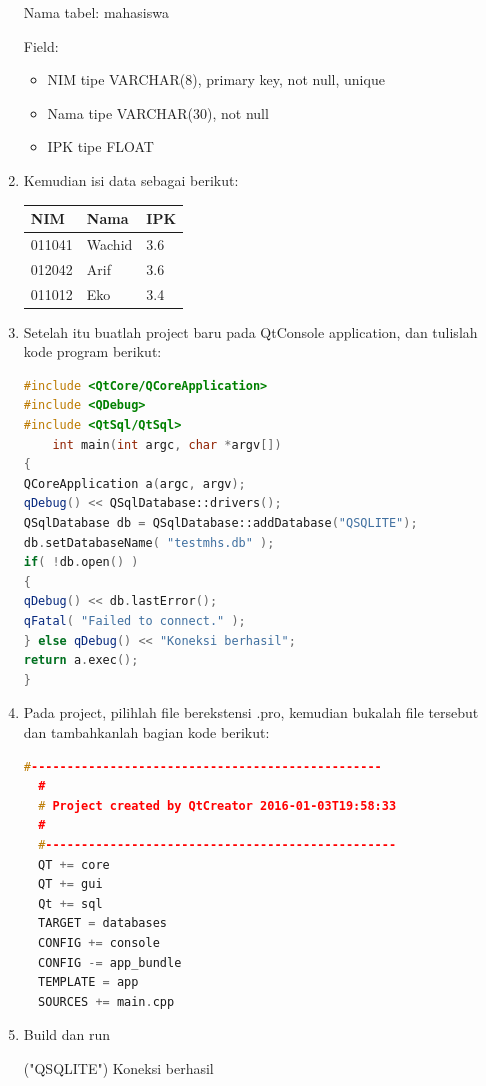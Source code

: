 \begin{enumerate}
Nama tabel: mahasiswa

Field:

\begin{itemize}

\item
  NIM tipe VARCHAR(8), primary key, not null, unique
\item
  Nama tipe VARCHAR(30), not null
\item
  IPK tipe FLOAT
\end{itemize}


\item
  Kemudian isi data sebagai berikut:


\begin{longtable}[]{@{}lll@{}}
\toprule
NIM & Nama & IPK\tabularnewline
\midrule
\endhead
011041 & Wachid & 3.6\tabularnewline
012042 & Arif & 3.6\tabularnewline
011012 & Eko & 3.4\tabularnewline
\bottomrule
\end{longtable}


\item
  Setelah itu buatlah project baru pada QtConsole application, dan
  tulislah kode program berikut:

\begin{lstlisting}[language=c++, caption=Percobaan koneksi SQLite dengan QtConsole]
#include <QtCore/QCoreApplication>
#include <QDebug>
#include <QtSql/QtSql>
    int main(int argc, char *argv[])
{
QCoreApplication a(argc, argv);
qDebug() << QSqlDatabase::drivers();
QSqlDatabase db = QSqlDatabase::addDatabase("QSQLITE");
db.setDatabaseName( "testmhs.db" );
if( !db.open() )
{
qDebug() << db.lastError();
qFatal( "Failed to connect." );
} else qDebug() << "Koneksi berhasil";
return a.exec();
}
\end{lstlisting}

\item
  Pada project, pilihlah file berekstensi .pro, kemudian bukalah file
  tersebut dan tambahkanlah bagian kode berikut:
  
  \begin{lstlisting}[language=c++]
  #-------------------------------------------------
  #
  # Project created by QtCreator 2016-01-03T19:58:33
  #
  #-------------------------------------------------
  QT += core
  QT += gui
  Qt += sql
  TARGET = databases
  CONFIG += console
  CONFIG -= app_bundle
  TEMPLATE = app
  SOURCES += main.cpp
  \end{lstlisting}
  
\item
  Build dan run

\begin{lcverbatim}
("QSQLITE")
Koneksi berhasil
\end{lcverbatim}
\end{enumerate}

